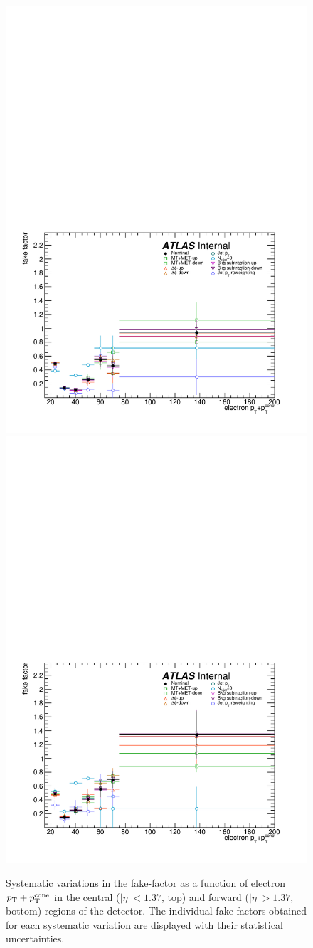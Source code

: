 \begin{figure}[htbp]
  \centering
  \includegraphics[width=.6\textwidth]{figs/ssww_13tev/backgrounds/ff/elec_central_ff_sys}\\
  \includegraphics[width=.6\textwidth]{figs/ssww_13tev/backgrounds/ff/elec_forward_ff_sys}
  \caption{Systematic variations in the fake-factor as a function of electron $p_{\mathrm{T}}+p_{\mathrm{T}}^{\textrm{cone}}$ in the central ($|\eta|<1.37$, top) and forward ($|\eta| > 1.37$, bottom) regions of the detector.  The individual fake-factors obtained for each systematic variation are displayed with their statistical uncertainties.}
  \label{fig:ssww13tev_ff_elec_sys}
\end{figure}

